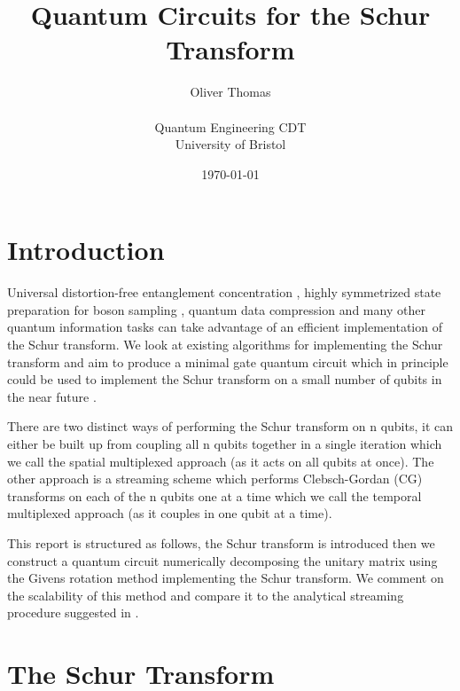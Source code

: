 \documentclass[12pt]{article}
\begin{document}

    \title{Quantum Circuits for the Schur Transform}
    \author{Oliver Thomas \\[0.5em] \\ Quantum Engineering CDT \\ University of Bristol}
    \date{\today}
    \maketitle


\section{Introduction}

Universal distortion-free entanglement concentration \cite{blume2014streaming}, highly symmetrized state preparation for boson sampling \cite{moylett2018quantum}, quantum data compression \cite{plesch2010efficient} and many other quantum information tasks \cite{harrow2005applications} can take advantage of an efficient implementation of the Schur transform. We look at existing algorithms for implementing the Schur transform and aim to produce a minimal gate quantum circuit which in principle could be used to implement the Schur transform on a small number of qubits in the near future \cite{kirby2017practical}.

There are two distinct ways of performing the Schur transform on n qubits, it can either be built up from coupling all n qubits together in a single iteration which we call the spatial multiplexed approach (as it acts on all qubits at once). The other approach is a streaming scheme which performs Clebsch-Gordan (CG) transforms on each of the n qubits one at a time which we call the temporal multiplexed approach (as it couples in one qubit at a time).  

This report is structured as follows, the Schur transform is introduced then we construct a quantum circuit numerically decomposing the unitary matrix using the Givens rotation method \cite{li2013decomposition} implementing the Schur transform. We comment on the scalability of this method and compare it to the analytical streaming procedure suggested in \cite{bacon2006efficient}. 

\section{The Schur Transform}
\end{document}
